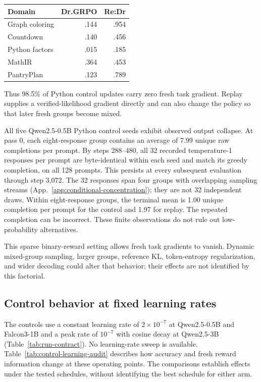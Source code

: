 \documentclass{article}
\newcommand{\1}{\mathbf 1}
\theoremstyle{remark}
\theoremstyle{definition}
\theoremstyle{plain}
\begin{document}
\begin{center}
\small
\begin{tabular}{@{}lrr@{}}
\toprule
\textbf{Domain} & \textbf{Dr.GRPO} & \textbf{Re:Dr} \\
\midrule
Graph coloring & .144 & .954 \\
Countdown & .140 & .456 \\
Python factors & .015 & .185 \\
MathIR & .364 & .453 \\
PantryPlan & .123 & .789 \\
\bottomrule
\end{tabular}
\end{center}

Thus 98.5\% of Python control updates carry zero fresh task gradient.
Replay supplies a verified-likelihood gradient directly and can also
change the policy so that later fresh groups become mixed.

All five Qwen2.5-0.5B Python control seeds exhibit observed output collapse.
At pass 0, each eight-response group contains an average of 7.99 unique raw
completions per prompt. By steps 288--480, all 32 recorded temperature-1
responses per prompt are byte-identical within each seed and match its greedy
completion, on all 128 prompts. This persists at every subsequent evaluation
through step 3,072. The 32 responses span four groups with overlapping sampling
streams (App.~\ref{app:conditional-concentration}); they are not 32 independent
draws. Within eight-response groups, the terminal mean is 1.00 unique
completion per prompt for the control and 1.97 for replay. The repeated
completion can be incorrect. These finite observations do not rule out
low-probability alternatives.

This sparse binary-reward setting allows fresh task gradients to vanish.
Dynamic mixed-group sampling, larger groups, reference KL, token-entropy
regularization, and wider decoding could alter that behavior; their effects
are not identified by this factorial.

\subsection{Control behavior at fixed learning rates}
\label{app:control-learning-audit}

The controls use a constant learning rate of $2\times10^{-7}$ at
Qwen2.5-0.5B and Falcon3-1B and a peak rate of $10^{-7}$ with cosine decay
at Qwen2.5-3B (Table~\ref{tab:run-contract}). No learning-rate sweep is
available. Table~\ref{tab:control-learning-audit} describes how accuracy and
fresh reward information change at these operating points. The comparisons
establish effects under the tested schedules, without identifying the best
schedule for either arm.
\end{document}
